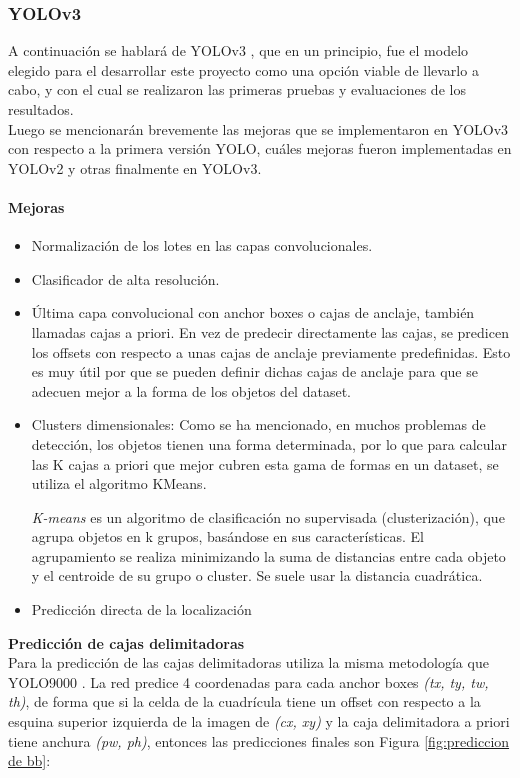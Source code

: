 \subsubsection{YOLOv3}

A continuación se hablará de YOLOv3 \cite{yolov3}, que en un principio, fue el modelo elegido para el desarrollar este proyecto como una opción viable de llevarlo a cabo, y con el cual se realizaron las primeras pruebas y evaluaciones de los resultados. \\
Luego se mencionarán brevemente las mejoras que se implementaron en YOLOv3 con respecto a la primera versión YOLO, cuáles mejoras fueron implementadas en YOLOv2 y otras finalmente en YOLOv3.

\paragraph{Mejoras}
\begin{itemize}
    \item Normalización de los lotes en las capas convolucionales.
    \item Clasificador de alta resolución.
    \item Última capa convolucional con anchor boxes o cajas de anclaje, también llamadas cajas a priori. En vez de predecir directamente las cajas, se predicen los offsets con respecto a unas cajas de anclaje previamente predefinidas. Esto es muy útil por que se pueden definir dichas cajas de anclaje para que se adecuen mejor a la forma de los objetos del dataset.
    \item Clusters dimensionales: Como se ha mencionado, en muchos problemas de detección, los objetos tienen una forma determinada, por lo que para calcular las K cajas a priori que mejor cubren esta gama de formas en un dataset, se utiliza el algoritmo KMeans\cite{kmeans}.
    
    \textit{K-means} es un algoritmo de clasificación no supervisada (clusterización), que agrupa objetos en k grupos, basándose en sus características. El agrupamiento se realiza minimizando la suma de distancias entre cada objeto y el centroide de su grupo o cluster. Se suele usar la distancia cuadrática.
    \item Predicción directa de la localización
\end{itemize}

\textbf{Predicción de cajas delimitadoras} \\

Para la predicción de las cajas delimitadoras utiliza la misma metodología que YOLO9000 \cite{yolov2}. La red predice 4 coordenadas para cada anchor boxes \textit{(tx, ty, tw, th)}, de forma que si la celda de la cuadrícula tiene un offset con respecto a la esquina superior izquierda de la imagen de \textit{(cx, xy)} y la caja delimitadora a priori tiene anchura \textit{(pw, ph)}, entonces las predicciones finales son Figura \ref{fig:prediccion de bb}:


